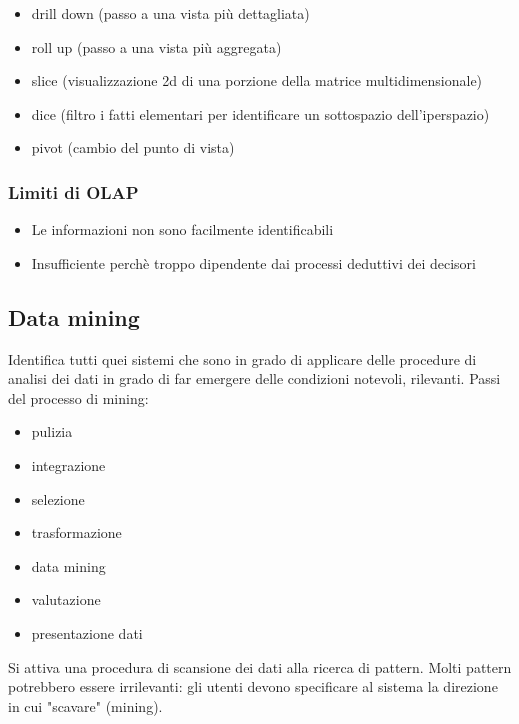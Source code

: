 \begin{itemize}

\item
  drill down (passo a una vista pi\`u dettagliata)
\item
  roll up (passo a una vista pi\`u aggregata)
\item
  slice (visualizzazione 2d di una porzione della matrice
  multidimensionale)
\item
  dice (filtro i fatti elementari per identificare un sottospazio
  dell'iperspazio)
\item
  pivot (cambio del punto di vista)
\end{itemize}

\subsubsection{Limiti di OLAP}\label{limiti-di-olap}

\begin{itemize}

\item
  Le informazioni non sono facilmente identificabili
\item
  Insufficiente perch\`e troppo dipendente dai processi deduttivi dei decisori
\end{itemize}

\subsection{Data mining}\label{data-mining}

Identifica tutti quei sistemi che sono in grado di applicare delle
procedure di analisi dei dati in grado di far emergere delle condizioni notevoli, rilevanti. Passi del processo di mining:

\begin{itemize}

\item
  pulizia
\item
  integrazione
\item
  selezione
\item
  trasformazione
\item
  data mining
\item
  valutazione
\item
  presentazione dati
\end{itemize}

Si attiva una procedura di scansione dei dati alla ricerca di pattern.
Molti pattern potrebbero essere irrilevanti: gli utenti devono
specificare al sistema la direzione in cui "scavare"  (mining).

